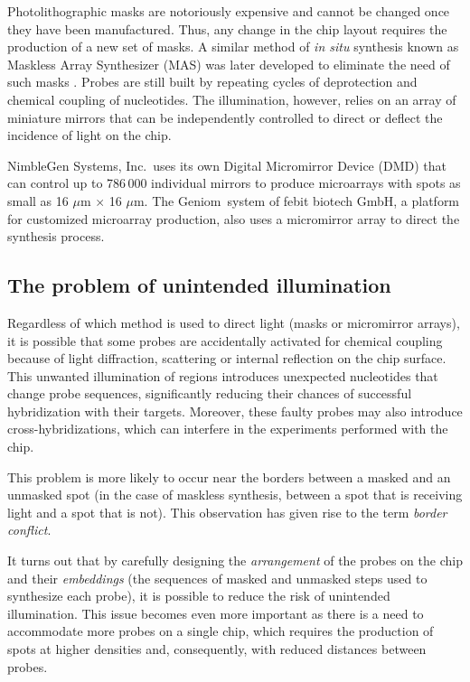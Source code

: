 \documentclass{w-edbk}
\newcommand{\textR}{\raisebox{.6ex}{\scriptsize \textregistered}}
\begin{document}
Photolithographic masks are notoriously expensive and cannot be changed once
they have been manufactured. Thus, any change in the chip layout requires the
production of a new set of masks. A similar method of \emph{in situ} synthesis
known as Maskless Array Synthesizer (MAS) was later developed to eliminate the
need of such masks \citep{Singh-Gasson1999}. Probes are still built by
repeating cycles of deprotection and chemical coupling of nucleotides. The
illumination, however, relies on an array of miniature mirrors that can be
independently controlled to direct or deflect the incidence of light on the
chip.

NimbleGen Systems, Inc.\ uses its own Digital Micromirror Device (DMD) that
can control up to 786\,000 individual mirrors to produce microarrays with
spots as small as 16 $\mu$m $\times$ 16 $\mu$m. The Geniom\textR\ system of
febit biotech GmbH, a platform for customized microarray production, also uses
a micromirror array to direct the synthesis process.


\subsection{The problem of unintended illumination}

Regardless of which method is used to direct light (masks or micromirror
arrays), it is possible that some probes are accidentally activated for
chemical coupling because of light diffraction, scattering or internal
reflection on the chip surface. This unwanted illumination of regions
introduces unexpected nucleotides that change probe sequences,
significantly reducing their chances of successful hybridization with their
targets. Moreover, these faulty probes may also introduce
cross-hybridizations, which can interfere in the experiments performed with
the chip.

This problem is more likely to occur near the borders between a masked and
an unmasked spot (in the case of maskless synthesis, between a spot that
is receiving light and a spot that is not). This observation has given rise to
the term \emph{border conflict}.

It turns out that by carefully designing the \emph{arrangement} of the probes
on the chip and their \emph{embeddings} (the sequences of masked and unmasked
steps used to synthesize each probe), it is possible to reduce the risk of
unintended illumination. This issue becomes even more important as there is a
need to accommodate more probes on a single chip, which requires the
production of spots at higher densities and, consequently, with reduced
distances between probes.
\end{document}
